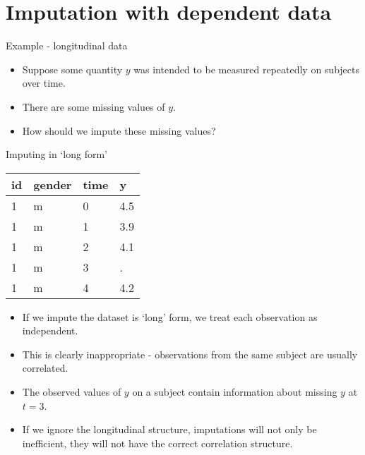 \documentclass[ignorenonframetext,]{beamer}
\providecommand{\tightlist}{%
  \setlength{\itemsep}{0pt}\setlength{\parskip}{0pt}}
\begin{document}
\hypertarget{imputation-with-dependent-data}{%
\section{Imputation with dependent
data}\label{imputation-with-dependent-data}}

\begin{frame}{Example - longitudinal data}
\protect\hypertarget{example---longitudinal-data}{}

\begin{itemize}
\tightlist
\item
  Suppose some quantity \(y\) was intended to be measured repeatedly on
  subjects over time.
\item
  There are some missing values of \(y\).
\item
  How should we impute these missing values?
\end{itemize}

\end{frame}

\begin{frame}{Imputing in `long form'}
\protect\hypertarget{imputing-in-long-form}{}

\begin{longtable}[]{@{}llll@{}}
\toprule
id & gender & time & y\tabularnewline
\midrule
\endhead
1 & m & 0 & 4.5\tabularnewline
1 & m & 1 & 3.9\tabularnewline
1 & m & 2 & 4.1\tabularnewline
1 & m & 3 & .\tabularnewline
1 & m & 4 & 4.2\tabularnewline
\bottomrule
\end{longtable}

\begin{itemize}
\tightlist
\item
  If we impute the dataset is `long' form, we treat each observation as
  independent.
\item
  This is clearly inappropriate - observations from the same subject are
  usually correlated.
\item
  The observed values of \(y\) on a subject contain information about
  missing \(y\) at \(t=3\).
\item
  If we ignore the longitudinal structure, imputations will not only be
  inefficient, they will not have the correct correlation structure.
\end{itemize}

\end{frame}
\end{document}
